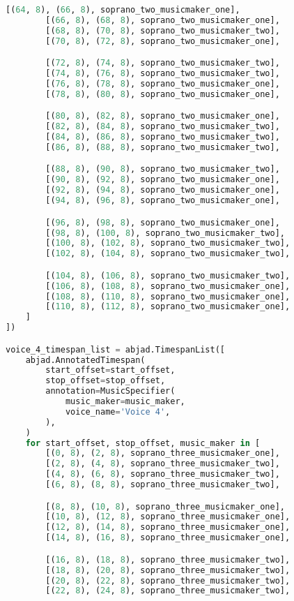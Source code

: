 \begin{lstlisting}[language=Python, caption=Invocation Source Code]
        [(64, 8), (66, 8), soprano_two_musicmaker_one],
        [(66, 8), (68, 8), soprano_two_musicmaker_one],
        [(68, 8), (70, 8), soprano_two_musicmaker_two],
        [(70, 8), (72, 8), soprano_two_musicmaker_one],

        [(72, 8), (74, 8), soprano_two_musicmaker_two],
        [(74, 8), (76, 8), soprano_two_musicmaker_two],
        [(76, 8), (78, 8), soprano_two_musicmaker_one],
        [(78, 8), (80, 8), soprano_two_musicmaker_one],

        [(80, 8), (82, 8), soprano_two_musicmaker_one],
        [(82, 8), (84, 8), soprano_two_musicmaker_two],
        [(84, 8), (86, 8), soprano_two_musicmaker_two],
        [(86, 8), (88, 8), soprano_two_musicmaker_two],

        [(88, 8), (90, 8), soprano_two_musicmaker_two],
        [(90, 8), (92, 8), soprano_two_musicmaker_one],
        [(92, 8), (94, 8), soprano_two_musicmaker_one],
        [(94, 8), (96, 8), soprano_two_musicmaker_one],

        [(96, 8), (98, 8), soprano_two_musicmaker_one],
        [(98, 8), (100, 8), soprano_two_musicmaker_two],
        [(100, 8), (102, 8), soprano_two_musicmaker_two],
        [(102, 8), (104, 8), soprano_two_musicmaker_two],

        [(104, 8), (106, 8), soprano_two_musicmaker_two],
        [(106, 8), (108, 8), soprano_two_musicmaker_one],
        [(108, 8), (110, 8), soprano_two_musicmaker_one],
        [(110, 8), (112, 8), soprano_two_musicmaker_one],
    ]
])

voice_4_timespan_list = abjad.TimespanList([
    abjad.AnnotatedTimespan(
        start_offset=start_offset,
        stop_offset=stop_offset,
        annotation=MusicSpecifier(
            music_maker=music_maker,
            voice_name='Voice 4',
        ),
    )
    for start_offset, stop_offset, music_maker in [
        [(0, 8), (2, 8), soprano_three_musicmaker_one],
        [(2, 8), (4, 8), soprano_three_musicmaker_two],
        [(4, 8), (6, 8), soprano_three_musicmaker_two],
        [(6, 8), (8, 8), soprano_three_musicmaker_two],

        [(8, 8), (10, 8), soprano_three_musicmaker_one],
        [(10, 8), (12, 8), soprano_three_musicmaker_one],
        [(12, 8), (14, 8), soprano_three_musicmaker_one],
        [(14, 8), (16, 8), soprano_three_musicmaker_one],

        [(16, 8), (18, 8), soprano_three_musicmaker_two],
        [(18, 8), (20, 8), soprano_three_musicmaker_two],
        [(20, 8), (22, 8), soprano_three_musicmaker_two],
        [(22, 8), (24, 8), soprano_three_musicmaker_two],


\end{lstlisting}
